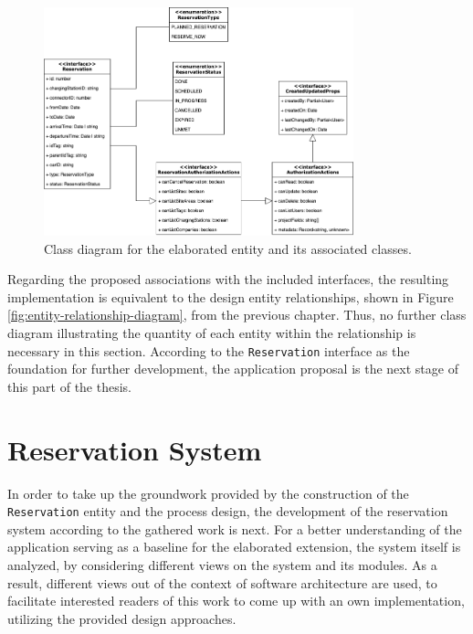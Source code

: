 \begin{figure}[h]
    \centering
    \includegraphics[width=0.8\textwidth,keepaspectratio]{resources/images/main/6_implementation/Reservation.png}
    \caption{Class diagram for the elaborated entity and its associated classes.}
    \label{fig:reservation-class-diagram}
\end{figure}

\noindent Regarding the proposed associations with the included interfaces, the resulting implementation is equivalent to the design entity relationships, shown in Figure \ref{fig:entity-relationship-diagram}, from the previous chapter. Thus, no further class diagram illustrating the quantity of each entity within the relationship is necessary in this section.
According to the \texttt{Reservation} interface as the foundation for further development, the application proposal is the next stage of this part of the thesis. 

\section{Reservation System}
\label{ch:Implementation:sec:Reservation System}

In order to take up the groundwork provided by the construction of the \texttt{Reservation} entity and the process design, the development of the reservation system according to the gathered work is next.
For a better understanding of the application serving as a baseline for the elaborated extension, the system itself is analyzed, by considering different views on the system and its modules.
As a result, different views out of the context of software architecture are used, to facilitate interested readers of this work to come up with an own implementation, utilizing the provided design approaches.

